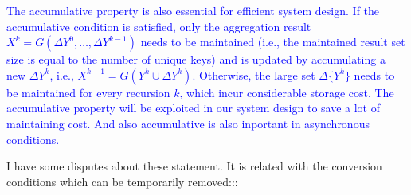 {



\textcolor{blue}{
The accumulative property is also essential for efficient system design. If the accumulative condition is satisfied, only the aggregation result $X^k=G(\Delta Y^{0},\ldots,\Delta Y^{k-1})$ needs to be maintained (i.e., the maintained result set size is equal to the number of unique keys) and is updated by accumulating a new $\Delta Y^{k}$, i.e., $X^{k+1}=G(Y^k \cup \Delta Y^k)$. Otherwise, the large set $\Delta \{Y^{k}\}$ needs to be maintained for every recursion $k$, which incur considerable storage cost. The accumulative property will be exploited in our system design to save a lot of maintaining cost. And also accumulative is also inportant in asynchronous conditions.
}

{\color{blue}
I have some disputes about these statement. It is related with the conversion conditions which can be temporarily removed:::	
	
}}
